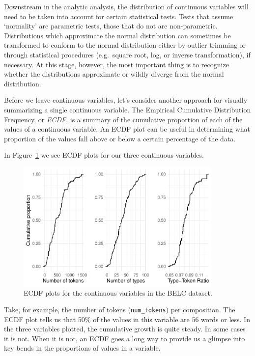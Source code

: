 \documentclass[
  letterpaper,
]{latex/krantz}
\begin{document}
Downstream in the analytic analysis, the distribution of continuous
variables will need to be taken into account for certain statistical
tests. Tests that assume `normality' are parametric tests, those that do
not are non-parametric. Distributions which approximate the normal
distribution can sometimes be transformed to conform to the normal
distribution either by outlier trimming or through statistical
procedures (e.g.~square root, log, or inverse transformation), if
necessary. At this stage, however, the most important thing is to
recognize whether the distributions approximate or wildly diverge from
the normal distribution.

Before we leave continuous variables, let's consider another approach
for visually summarizing a single continuous variable. The Empirical
Cumulative Distribution Frequency, or \emph{ECDF}, is a summary of the
cumulative proportion of each of the values of a continuous variable. An
ECDF plot can be useful in determining what proportion of the values
fall above or below a certain percentage of the data.

In Figure~\ref{fig-summarize-ecdf-belc} we see ECDF plots for our three
continuous variables.

\begin{figure}[h]

{\centering \includegraphics[width=0.9\textwidth,height=\textheight]{./approaching-analysis_files/figure-pdf/fig-summarize-ecdf-belc-1.pdf}

}

\caption{\label{fig-summarize-ecdf-belc}ECDF plots for the continuous
variables in the BELC dataset.}

\end{figure}

Take, for example, the number of tokens (\texttt{num\_tokens}) per
composition. The ECDF plot tells us that 50\% of the values in this
variable are 56 words or less. In the three variables plotted, the
cumulative growth is quite steady. In some cases it is not. When it is
not, an ECDF goes a long way to provide us a glimpse into key bends in
the proportions of values in a variable.
\end{document}

